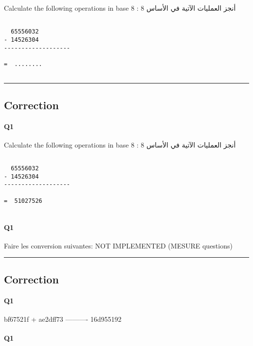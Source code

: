 Calculate  the following operations in base 8 :  أنجز العمليات الآتية في الأساس 8

\begin{verbatim}

  65556032
- 14526304
-------------------

=  ........


\end{verbatim}


\hrule width 1\linewidth
\pagebreak

\subsection{Correction}


\paragraph{Q1}

Calculate  the following operations in base 8 :  أنجز العمليات الآتية في الأساس 8

\begin{verbatim}

  65556032
- 14526304
-------------------

=  51027526


\end{verbatim}
\pagebreak

\paragraph{Q1}

Faire les conversion suivantes: NOT IMPLEMENTED (MESURE questions) 


\hrule width 1\linewidth
\pagebreak

\subsection{Correction}


\paragraph{Q1}

  bf67521f
+ ae2dff73
----------
 16d955192

\pagebreak

\paragraph{Q1}



